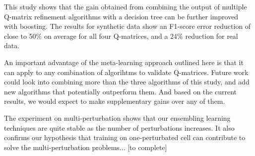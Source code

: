 \documentclass{edm_template}
\begin{document}
This study shows that the gain obtained from combining the output of multiple Q-matrix refinement algorithms with a decision tree can be further improved with boosting.  The results for synthetic data show an F1-score error reduction of close to 50\% on average for all four Q-matrices, and a 24\% reduction for real data.  

An important advantage of the meta-learning approach outlined here is that it can apply to any combination of algorihtms to validate Q-matrices.  Future work could look into combining more than the three algorithms of this study, and add new algorithms that potentially outperform them. And based on the current results, we would expect to make supplementary gains over any of them.

The experiment on multi-perturbation shows that our ensembling learning techniques are quite stable as the number of perturbations increases. It also confirms our hypothesis that 
training on one-perturbated cell can contribute to solve the multi-perturbation problems... [to complete]

\balance


\end{document}
